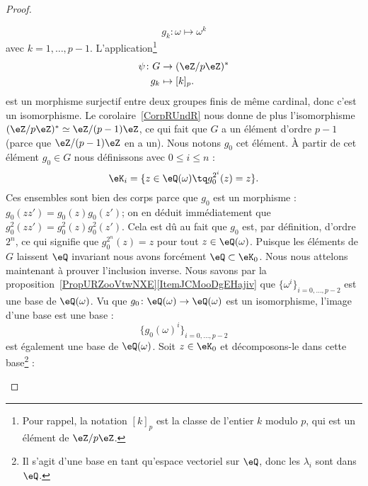 \begin{proof}
\begin{subproof}
\begin{subproof}
			\begin{equation}
				g_k\colon \omega\mapsto \omega^k
			\end{equation}
			avec \( k=1,\ldots, p-1\). L'application\footnote{Pour rappel, la notation \( [k]_p\) est la classe de l'entier \( k\) modulo \( p\), qui est un élément de \( \eZ/p\eZ\).}
			\begin{equation}
				\begin{aligned}
					\psi\colon G & \to (\eZ/p\eZ)^* \\
					g_k          & \mapsto [k]_p .
				\end{aligned}
			\end{equation}
			est un morphisme surjectif entre deux groupes finis de même cardinal, donc c'est un isomorphisme. Le corolaire~\ref{CorpRUndR} nous donne de plus l'isomorphisme \( (\eZ/p\eZ)^*\simeq \eZ/(p-1)\eZ\), ce qui fait que \( G\) a un élément d'ordre \( p-1\) (parce que \( \eZ/(p-1)\eZ\) en a un). Nous notons \( g_0\) cet élément.
			À partir de cet élément \( g_0\in G\) nous définissons avec \( 0\leq i\leq n\) :
			\begin{equation}
				\eK_i=\{ z\in \eQ(\omega)\tq g_0^{2^i}(z)=z \}.
			\end{equation}
			Ces ensembles sont bien des corps parce que \( g_0\) est un morphisme : \( g_0(zz')=g_0(z)g_0(z')\); on en déduit immédiatement que \( g_0^2(zz')=g_0^2(z)g_0^2(z')\).
			\spitem[\( \eK_n=\eQ(\omega)\)]
			Cela est dû au fait que \( g_0\) est, par définition, d'ordre \( 2^n\), ce qui signifie que \( g_0^{2^n}(z)=z\) pour tout \( z\in \eQ(\omega)\).
			\spitem[\( \eK_0=\eQ\)]
			Puisque les éléments de \( G\) laissent \( \eQ\) invariant nous avons forcément \( \eQ\subset \eK_0\). Nous nous attelons maintenant à prouver l'inclusion inverse. Nous savons par la proposition~\ref{PropURZooVtwNXE}\ref{ItemJCMooDgEHajiv} que \( \{ \omega^i \}_{i=0,\ldots, p-2}\) est une base de \( \eQ(\omega)\). Vu que \( g_0\colon \eQ(\omega)\to \eQ(\omega)\) est un isomorphisme, l'image d'une base est une base :
			\begin{equation}
				\{ g_0(\omega)^i \}_{i=0,\ldots, p-2}
			\end{equation}
			est également une base de \( \eQ(\omega)\). Soit \( z\in \eK_0\) et décomposons-le dans cette base\footnote{Il s'agit d'une base en tant qu'espace vectoriel sur \( \eQ\), donc les \( \lambda_i\) sont dans \( \eQ\).} :

\end{subproof}
\end{subproof}
\end{proof}
